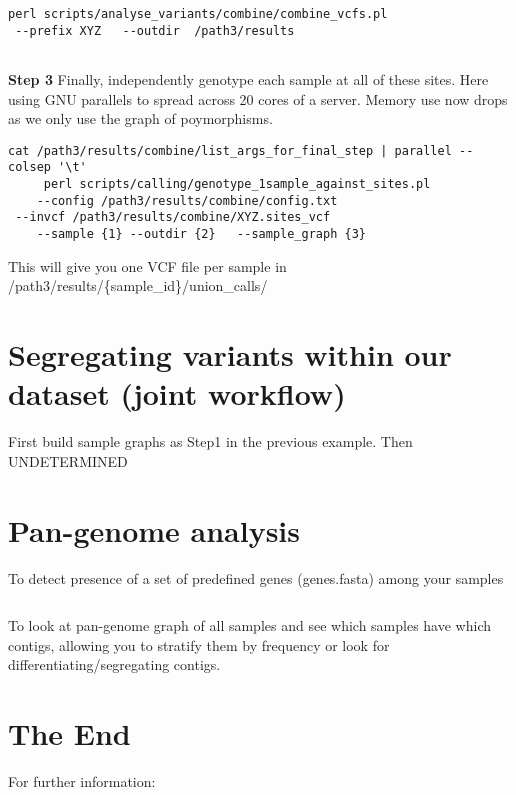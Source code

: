 \documentclass[a4paper,9pt]{extarticle}
\begin{document}
\begin{multicols*}{2}
\begin{verbatim}
perl scripts/analyse_variants/combine/combine_vcfs.pl 
 --prefix XYZ   --outdir  /path3/results
   
\end{verbatim}
{\bf Step 3} Finally, independently genotype each sample at all of these sites. Here using GNU parallels to spread across 20 cores of a server. Memory use now drops as we only use the graph of poymorphisms.
\begin{verbatim}
cat /path3/results/combine/list_args_for_final_step | parallel --colsep '\t' 
     perl scripts/calling/genotype_1sample_against_sites.pl 
	--config /path3/results/combine/config.txt 
 --invcf /path3/results/combine/XYZ.sites_vcf 
	--sample {1} --outdir {2}   --sample_graph {3} 
\end{verbatim}
This will give you one VCF file per sample in \\
/path3/results/\{sample\_id\}/union\_calls/

\section{Segregating variants within our dataset (joint workflow)}
First build sample graphs as Step1 in the previous example. Then UNDETERMINED



\section{Pan-genome analysis}

To detect presence of a set of predefined genes (genes.fasta) among your samples
\begin{verbatim}
\end{verbatim}
To look at pan-genome graph of all samples and see which samples have which contigs, allowing you to stratify them by frequency or look for differentiating/segregating contigs.


\section{The End}

For further information:


\end{multicols*}
\end{document}
